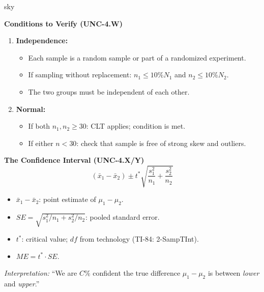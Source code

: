 \documentclass[10pt]{article}
\begin{document}
\begin{skillbox}{sky}
\begin{minipage}[t]{0.48\linewidth}
    \textbf{Conditions to Verify (UNC-4.W)}
    \begin{enumerate}
        \item \textbf{Independence:}
              \begin{itemize}
                  \item Each sample is a random sample or part of a randomized experiment.
                  \item If sampling without replacement: $n_1 \le 10\%N_1$ and
                        $n_2 \le 10\%N_2$.
                  \item The two groups must be independent of each other.
              \end{itemize}
        \item \textbf{Normal:}
              \begin{itemize}
                  \item If both $n_1, n_2 \ge 30$: CLT applies; condition is met.
                  \item If either $n < 30$: check that sample is free of strong skew
                        and outliers.
              \end{itemize}
    \end{enumerate}
\end{minipage}
\hfill
\begin{minipage}[t]{0.48\linewidth}
    \textbf{The Confidence Interval (UNC-4.X/Y)}
    \[
        (\bar x_1 - \bar x_2) \pm t^* \sqrt{\frac{s_1^2}{n_1} + \frac{s_2^2}{n_2}}
    \]
    \begin{itemize}
        \item $\bar x_1 - \bar x_2$: point estimate of $\mu_1 - \mu_2$.
        \item $SE = \sqrt{s_1^2/n_1 + s_2^2/n_2}$: pooled standard error.
        \item $t^*$: critical value; $df$ from technology (TI-84: 2-SampTInt).
        \item $ME = t^* \cdot SE$.
    \end{itemize}
    \textit{Interpretation:} ``We are $C\%$ confident the true difference $\mu_1 - \mu_2$
    is between \textit{lower} and \textit{upper}.''
\end{minipage}
\end{skillbox}
\end{document}
